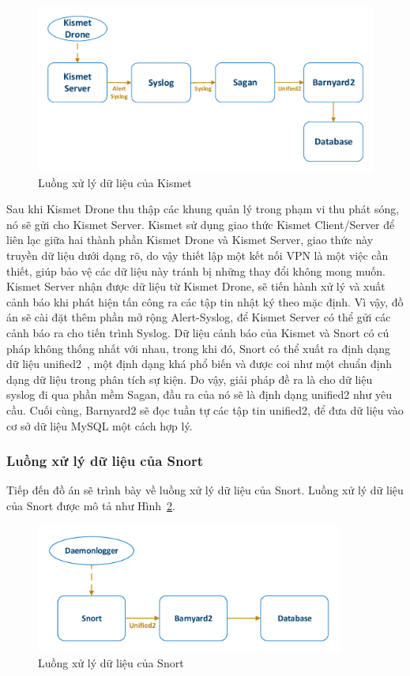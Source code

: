 \begin{figure}[H]
    \centering
    \includegraphics[width=1.0\textwidth]{kismet-workflow}
    \caption{
        \label{fig:kismet-workflow}
        Luồng xử lý dữ liệu của Kismet}
\end{figure}

Sau khi Kismet Drone thu thập các khung quản lý trong phạm vi thu phát sóng, nó sẽ gửi cho Kismet Server. Kismet sử dụng giao thức Kismet Client/Server để liên lạc giữa hai thành phần Kismet Drone và Kismet Server, giao thức này truyền dữ liệu dưới dạng rõ, do vậy thiết lập một kết nối VPN là một việc cần thiết, giúp bảo vệ các dữ liệu này tránh bị những thay đổi không mong muốn. Kismet Server nhận được dữ liệu từ Kismet Drone, sẽ tiến hành xử lý và xuất cảnh báo khi phát hiện tấn công ra các tập tin nhật ký theo mặc định. Vì vậy, đồ án sẽ cài đặt thêm phần mở rộng Alert-Syslog, để Kismet Server có thể gửi các cảnh báo ra cho tiến trình Syslog. Dữ liệu cảnh báo của Kismet và Snort có cú pháp không thống nhất với nhau, trong khi đó, Snort có thể xuất ra định dạng dữ liệu unified2~\cite{snort2017documents}, một định dạng khá phổ biến và được coi như một chuẩn định dạng dữ liệu trong phân tích sự kiện. Do vậy, giải pháp đề ra là cho dữ liệu syslog đi qua phần mềm Sagan, đầu ra của nó sẽ là định dạng unified2 như yêu cầu. Cuối cùng, Barnyard2 sẽ đọc tuần tự các tập tin unified2, để đưa dữ liệu vào cơ sở dữ liệu MySQL một cách hợp lý.

\subsubsection{Luồng xử lý dữ liệu của Snort}
Tiếp đến đồ án sẽ trình bày về luồng xử lý dữ liệu của Snort. Luồng xử lý dữ liệu của Snort được mô tả như Hình~\ref{fig:snort-workflow}.

\begin{figure}[H]
    \centering
    \includegraphics[width=0.9\textwidth]{snort-workflow}
    \caption{
        \label{fig:snort-workflow}
        Luồng xử lý dữ liệu của Snort}
\end{figure}

